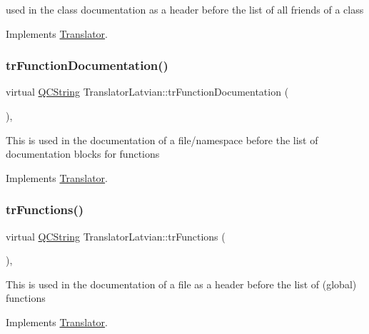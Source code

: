 used in the class documentation as a header before the list of all friends of a class 

Implements \mbox{\hyperlink{class_translator}{Translator}}.

\mbox{\label{class_translator_latvian_a5a2d4567d00f5f05358803311596b454}} 
\subsubsection{\texorpdfstring{trFunctionDocumentation()}{trFunctionDocumentation()}}
{\footnotesize\ttfamily virtual \mbox{\hyperlink{class_q_c_string}{Q\+C\+String}} Translator\+Latvian\+::tr\+Function\+Documentation (\begin{DoxyParamCaption}{ }\end{DoxyParamCaption})\hspace{0.3cm}{\ttfamily [inline]}, {\ttfamily [virtual]}}

This is used in the documentation of a file/namespace before the list of documentation blocks for functions 

Implements \mbox{\hyperlink{class_translator}{Translator}}.

\mbox{\label{class_translator_latvian_a85a2153154638a1ce89de80d2d4e1b4e}} 
\subsubsection{\texorpdfstring{trFunctions()}{trFunctions()}}
{\footnotesize\ttfamily virtual \mbox{\hyperlink{class_q_c_string}{Q\+C\+String}} Translator\+Latvian\+::tr\+Functions (\begin{DoxyParamCaption}{ }\end{DoxyParamCaption})\hspace{0.3cm}{\ttfamily [inline]}, {\ttfamily [virtual]}}

This is used in the documentation of a file as a header before the list of (global) functions 

Implements \mbox{\hyperlink{class_translator}{Translator}}.

